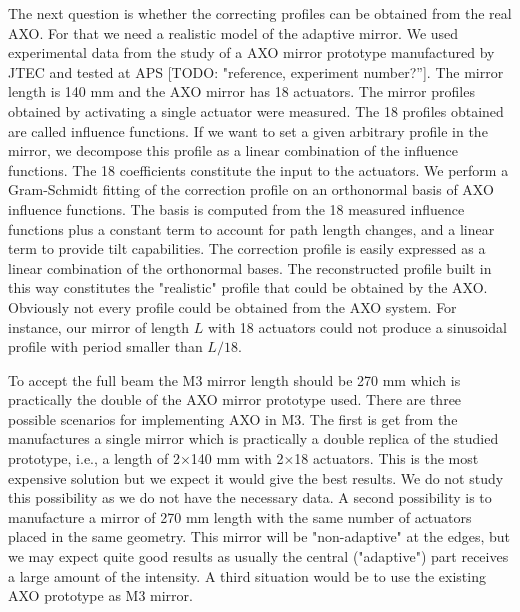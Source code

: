 \documentclass[preprint]{iucr}              %
\newcommand{\todo}[1]{{\color{red}[TODO: "#1'']}}
\newcommand{\inred}[1]{{\color{red}#1}}
\begin{document}
The next question is whether the correcting profiles can be obtained from the real AXO. For that we need a realistic model of the adaptive mirror.
We used experimental data from the study of a AXO mirror prototype manufactured by JTEC and tested at APS \todo{reference, experiment number?}. The mirror length is \inred{140 mm} and the AXO mirror has 18 actuators. The mirror profiles obtained by activating a single actuator were measured. The 18 profiles obtained are called influence functions. If we want to set a given arbitrary  profile in the mirror, we decompose this profile as a linear combination of the influence functions. The 18 coefficients constitute the input to the actuators.  
We perform a Gram-Schmidt fitting of the correction profile on an orthonormal basis of AXO influence functions. The basis is computed from the 18 measured influence functions plus a constant term to account for path length changes, and a linear term to provide tilt capabilities. The correction profile is easily expressed as a linear combination of the orthonormal bases. The reconstructed profile built in this way constitutes the "realistic" profile that could be obtained by the AXO. Obviously not every profile could be obtained from the AXO system. For instance, our mirror of length $L$ with 18 actuators could not produce a sinusoidal profile with period smaller than $L/18$. 

To accept the full beam the M3 mirror length should be 270 mm which is practically the double of the AXO mirror prototype used. There are three possible scenarios for implementing AXO in M3. The first is get from the manufactures a single mirror which is practically a double replica of the studied prototype, i.e., a length of 2$\times$140 mm with 2$\times$18 actuators. This is the most expensive solution but we expect it would give the best results. We do not study this possibility as we do not have the necessary data. A second possibility is to manufacture a mirror of 270 mm length with the same number of actuators placed in the same geometry. This mirror will be "non-adaptive" at the edges, but we may expect quite good results as usually the central ("adaptive") part receives a large amount of the intensity. A third situation would be to use the existing AXO prototype as M3 mirror.  
\end{document}
